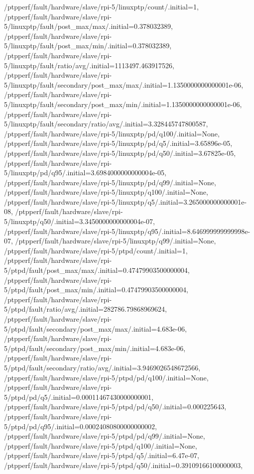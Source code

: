 {    /ptpperf/fault/hardware/slave/rpi-5/linuxptp/count/.initial=1,
    /ptpperf/fault/hardware/slave/rpi-5/linuxptp/fault/post_max/max/.initial=0.378032389,
    /ptpperf/fault/hardware/slave/rpi-5/linuxptp/fault/post_max/min/.initial=0.378032389,
    /ptpperf/fault/hardware/slave/rpi-5/linuxptp/fault/ratio/avg/.initial=1113497.463917526,
    /ptpperf/fault/hardware/slave/rpi-5/linuxptp/fault/secondary/post_max/max/.initial=1.1350000000000001e-06,
    /ptpperf/fault/hardware/slave/rpi-5/linuxptp/fault/secondary/post_max/min/.initial=1.1350000000000001e-06,
    /ptpperf/fault/hardware/slave/rpi-5/linuxptp/fault/secondary/ratio/avg/.initial=3.328445747800587,
    /ptpperf/fault/hardware/slave/rpi-5/linuxptp/pd/q100/.initial=None,
    /ptpperf/fault/hardware/slave/rpi-5/linuxptp/pd/q5/.initial=3.65896e-05,
    /ptpperf/fault/hardware/slave/rpi-5/linuxptp/pd/q50/.initial=3.67825e-05,
    /ptpperf/fault/hardware/slave/rpi-5/linuxptp/pd/q95/.initial=3.6984000000000004e-05,
    /ptpperf/fault/hardware/slave/rpi-5/linuxptp/pd/q99/.initial=None,
    /ptpperf/fault/hardware/slave/rpi-5/linuxptp/q100/.initial=None,
    /ptpperf/fault/hardware/slave/rpi-5/linuxptp/q5/.initial=3.265000000000001e-08,
    /ptpperf/fault/hardware/slave/rpi-5/linuxptp/q50/.initial=3.3450000000000004e-07,
    /ptpperf/fault/hardware/slave/rpi-5/linuxptp/q95/.initial=8.646999999999998e-07,
    /ptpperf/fault/hardware/slave/rpi-5/linuxptp/q99/.initial=None,
    /ptpperf/fault/hardware/slave/rpi-5/ptpd/count/.initial=1,
    /ptpperf/fault/hardware/slave/rpi-5/ptpd/fault/post_max/max/.initial=0.47479903500000004,
    /ptpperf/fault/hardware/slave/rpi-5/ptpd/fault/post_max/min/.initial=0.47479903500000004,
    /ptpperf/fault/hardware/slave/rpi-5/ptpd/fault/ratio/avg/.initial=282786.79868969624,
    /ptpperf/fault/hardware/slave/rpi-5/ptpd/fault/secondary/post_max/max/.initial=4.683e-06,
    /ptpperf/fault/hardware/slave/rpi-5/ptpd/fault/secondary/post_max/min/.initial=4.683e-06,
    /ptpperf/fault/hardware/slave/rpi-5/ptpd/fault/secondary/ratio/avg/.initial=3.9469026548672566,
    /ptpperf/fault/hardware/slave/rpi-5/ptpd/pd/q100/.initial=None,
    /ptpperf/fault/hardware/slave/rpi-5/ptpd/pd/q5/.initial=0.00011467430000000001,
    /ptpperf/fault/hardware/slave/rpi-5/ptpd/pd/q50/.initial=0.000225643,
    /ptpperf/fault/hardware/slave/rpi-5/ptpd/pd/q95/.initial=0.00024080800000000002,
    /ptpperf/fault/hardware/slave/rpi-5/ptpd/pd/q99/.initial=None,
    /ptpperf/fault/hardware/slave/rpi-5/ptpd/q100/.initial=None,
    /ptpperf/fault/hardware/slave/rpi-5/ptpd/q5/.initial=6.47e-07,
    /ptpperf/fault/hardware/slave/rpi-5/ptpd/q50/.initial=0.39109166100000003,
}
